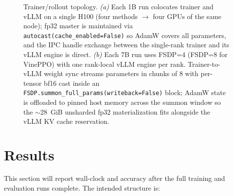\documentclass[11pt]{article}
\newcommand{\vineppo}{VinePPO}
\begin{document}
\begin{figure}[t]
\caption{Trainer/rollout topology. \emph{(a)} Each 1B run colocates trainer
and vLLM on a single H100 (four methods $\to$ four GPUs of the same node);
fp32 master is maintained via \texttt{autocast(cache\_enabled=False)} so
AdamW covers all parameters, and the IPC handle exchange between the
single-rank trainer and its vLLM engine is direct. \emph{(b)} Each 7B run
uses FSDP=4 (FSDP=8 for \vineppo{}) with one rank-local vLLM engine per
rank. Trainer-to-vLLM weight sync streams parameters in chunks of 8 with
per-tensor bf16 cast inside an
\texttt{FSDP.summon\_full\_params(writeback=False)} block; AdamW state is
offloaded to pinned host memory across the summon window so the
$\sim$28~GiB unsharded fp32 materialization fits alongside the vLLM KV
cache reservation.}
\label{fig:sysarch}
\end{figure}

\section{Results}
\label{sec:results}

This section will report wall-clock and accuracy after the full training and
evaluation runs complete. The intended structure is:
\end{document}
